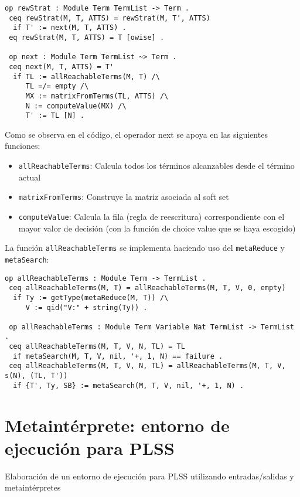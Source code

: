 \begin{lstlisting}[language=Maude]
 op rewStrat : Module Term TermList -> Term .
 ceq rewStrat(M, T, ATTS) = rewStrat(M, T', ATTS)
  if T' := next(M, T, ATTS) .
 eq rewStrat(M, T, ATTS) = T [owise] .

 op next : Module Term TermList ~> Term .
 ceq next(M, T, ATTS) = T'
  if TL := allReachableTerms(M, T) /\
     TL =/= empty /\
     MX := matrixFromTerms(TL, ATTS) /\
     N := computeValue(MX) /\
     T' := TL [N] .
\end{lstlisting}

\noindent
Como se observa en el código, el operador next se apoya en las siguientes funciones:

\begin{itemize}
\item \texttt{allReachableTerms}: Calcula todos los términos alcanzables desde el término actual
\item \texttt{matrixFromTerms}: Construye la matriz asociada al soft set
\item \texttt{computeValue}: Calcula la fila (regla de reescritura) correspondiente con el mayor valor de decisión (con la función de choice value que se haya escogido)
\end{itemize}

La función \texttt{allReachableTerms} se implementa haciendo uso del \texttt{metaReduce} y \texttt{metaSearch}:

\begin{lstlisting}[language=Maude]
 op allReachableTerms : Module Term -> TermList .
 ceq allReachableTerms(M, T) = allReachableTerms(M, T, V, 0, empty)
  if Ty := getType(metaReduce(M, T)) /\
     V := qid("V:" + string(Ty)) .

 op allReachableTerms : Module Term Variable Nat TermList -> TermList .
 ceq allReachableTerms(M, T, V, N, TL) = TL
  if metaSearch(M, T, V, nil, '+, 1, N) == failure .
 ceq allReachableTerms(M, T, V, N, TL) = allReachableTerms(M, T, V, s(N), (TL, T'))
  if {T', Ty, SB} := metaSearch(M, T, V, nil, '+, 1, N) .
\end{lstlisting}



\section{Metaintérprete: entorno de ejecución para PLSS}

Elaboración de un entorno de ejecución para PLSS utilizando entradas/salidas y metaintérpretes

